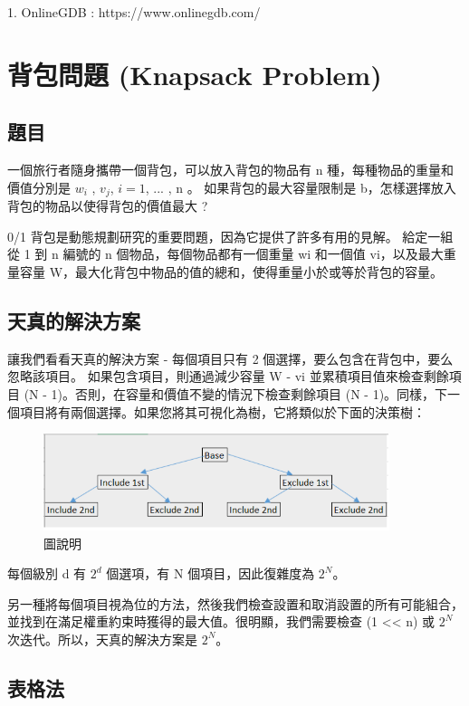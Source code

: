 \documentclass[10pt,UTF8]{ctexart}
\begin{document}
1. OnlineGDB : https://www.onlinegdb.com/ 


\section{背包問題 (Knapsack Problem)}

\subsection{題目}

一個旅行者隨身攜帶一個背包，可以放入背包的物品有 n 種，每種物品的重量和價值分別是 $w_{i}$ , $v_j$, $i = 1$, ... , n 。
如果背包的最大容量限制是 b，怎樣選擇放入背包的物品以使得背包的價值最大 ?


0/1 背包是動態規劃研究的重要問題，因為它提供了許多有用的見解。
給定一組從 1 到 n 編號的 n 個物品，每個物品都有一個重量 wi 和一個值 vi，以及最大重量容量 W，最大化背包中物品的值的總和，使得重量小於或等於背包的容量。

\subsection{天真的解決方案}


讓我們看看天真的解決方案 - 每個項目只有 2 個選擇，要么包含在背包中，要么忽略該項目。
如果包含項目，則通過減少容量 W - vi 並累積項目值來檢查剩餘項目 (N - 1)。否則，在容量和價值不變的情況下檢查剩餘項目 (N - 1)。同樣，下一個項目將有兩個選擇。如果您將其可視化為樹，它將類似於下面的決策樹：

\begin{figure}[H]
\centering 
\includegraphics[width=0.90\textwidth]{w6-kp-1.png} 
\caption{圖說明}
\label{Test}
\end{figure}

每個級別 d 有 $2^d$ 個選項，有 N 個項目，因此復雜度為 $2^N$。

另一種將每個項目視為位的方法，然後我們檢查設置和取消設置的所有可能組合，並找到在滿足權重約束時獲得的最大值。很明顯，我們需要檢查 (1 << n) 或 $2^N$ 次迭代。所以，天真的解決方案是 $2^N$。

\subsection{表格法}
\end{document}
